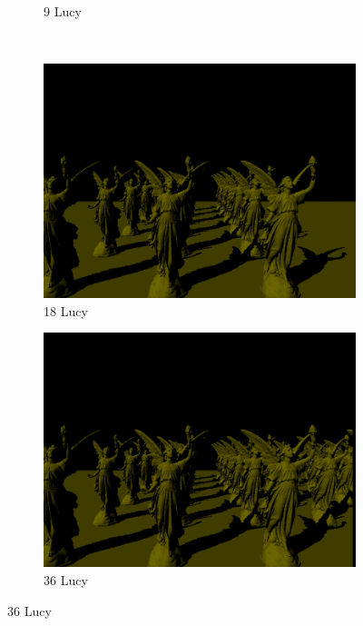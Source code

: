 \documentclass[a4paper, oneside, 10pt]{article}
\begin{document}
\begin{figure}[h]
\begin{subfigure}[b]{0.3\textwidth}
                \caption{9 Lucy}
                \label{fig:d9lucy}
        \end{subfigure}
        ~ %
        \begin{subfigure}[b]{0.3\textwidth}
                \includegraphics[width=\textwidth]{d18lucy}
                \caption{18 Lucy}
                \label{fig:d18lucy}
        \end{subfigure}
         \begin{subfigure}[b]{0.3\textwidth}
                \includegraphics[width=\textwidth]{d36lucy}
                \caption{36 Lucy}

\end{subfigure}
\end{figure}
\end{document}
